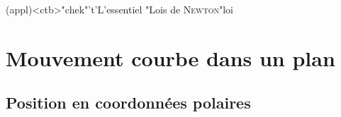 \documentclass[../../main/main.tex]{subfiles}
\begin{document}
\vspace*{\fill}
\newpage
\vspace*{\fill}

\begin{tcn}[%
		sidebyside, fontupper=\small, fontlower=\small
	](appl)<ctb>"chek"'t'{L'essentiel}
	\tcblower
	\tce"Lois de \textsc{Newton}"{loi}
\end{tcn}

\vspace*{\fill}

\newpage

\section{Mouvement courbe dans un plan}
\subsection{Position en coordonnées polaires}
\end{document}
